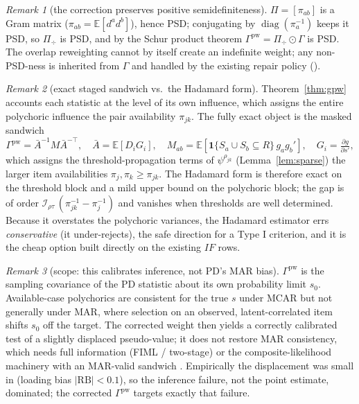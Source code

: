 \documentclass[11pt]{article}
\newcommand{\E}{\mathbb{E}}
\newcommand{\one}{\mathbf{1}}
\newcommand{\pw}{\mathrm{pw}}
\theoremstyle{plain}
\theoremstyle{remark}
\newtheorem*{remark}{Remark}
\begin{document}
\begin{remark}[the correction preserves positive semidefiniteness]
$\Pi=[\pi_{ab}]$ is a Gram matrix ($\pi_{ab}=\E[d^a d^b]$), hence PSD; conjugating
by $\operatorname{diag}(\pi_a^{-1})$ keeps it PSD, so $\Pi_{\!\div}$ is PSD, and by
the Schur product theorem $\Gamma^{\pw}=\Pi_{\!\div}\odot\Gamma$ is PSD. The
overlap reweighting cannot by itself create an indefinite weight; any
non-PSD-ness is inherited from $\Gamma$ and handled by the existing repair
policy ().
\end{remark}

\begin{remark}[exact staged sandwich vs.\ the Hadamard form]
Theorem~\ref{thm:gpw} accounts each statistic at the level of its own influence,
which assigns the entire polychoric influence the pair availability $\pi_{jk}$.
The fully exact object is the masked sandwich
\[
  \Gamma^{\pw}=\bar A^{-1} M \bar A^{-\top},
  \quad
  \bar A=\E[D_i G_i],
  \quad
  M_{ab}=\E[\one\{S_a\cup S_b\subseteq R\}\,g_a g_b'],
  \quad G_i=\tfrac{\partial g}{\partial s'},
\]
which assigns the threshold-propagation terms of $\psi^{\rho_{jk}}$ (Lemma~\ref{lem:sparse})
the larger item availabilities $\pi_j,\pi_k\ge\pi_{jk}$. The Hadamard form is
therefore exact on the threshold block and a mild upper bound on the polychoric
block; the gap is of order
$\mathcal I_{\rho\tau}\,(\pi_{jk}^{-1}-\pi_j^{-1})$ and vanishes when thresholds
are well determined. Because it overstates the polychoric variances, the
Hadamard estimator errs \emph{conservative} (it under-rejects), the safe
direction for a Type I criterion, and it is the cheap option built directly on
the existing $IF$ rows.
\end{remark}

\begin{remark}[scope: this calibrates inference, not PD's MAR bias]
$\Gamma^{\pw}$ is the sampling covariance of the PD statistic about its own
probability limit $s_0$. Available-case polychorics are consistent for the true
$s$ under MCAR but not generally under MAR, where selection on an observed,
latent-correlated item shifts $s_0$ off the target. The corrected weight then
yields a correctly calibrated test of a slightly displaced pseudo-value; it does
not restore MAR consistency, which needs full information (FIML / two-stage) or
the composite-likelihood machinery with an MAR-valid sandwich
\cite{katsikatsou2012}. Empirically the displacement was small in
\cite{chen2020} (loading bias $|\mathrm{RB}|<0.1$), so the inference failure, not
the point estimate, dominated; the corrected $\Gamma^{\pw}$ targets exactly that
failure.
\end{remark}
\end{document}
